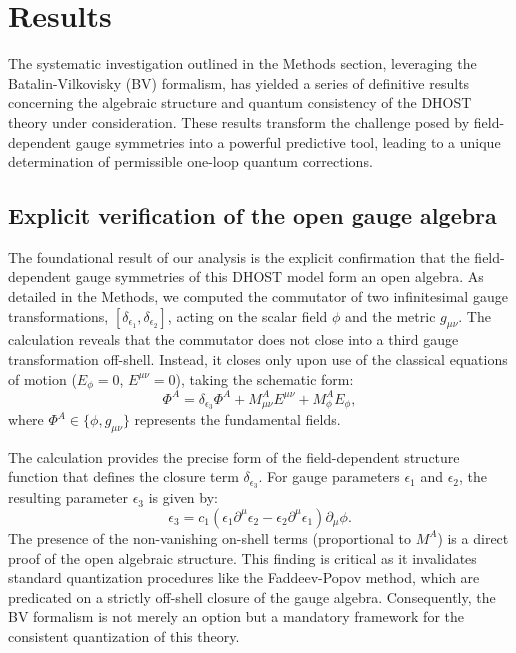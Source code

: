\documentclass[twocolumn]{aastex631}
\begin{document}
\section{Results}
\label{sec:results}
The systematic investigation outlined in the Methods section, leveraging the Batalin-Vilkovisky (BV) formalism, has yielded a series of definitive results concerning the algebraic structure and quantum consistency of the DHOST theory under consideration. These results transform the challenge posed by field-dependent gauge symmetries into a powerful predictive tool, leading to a unique determination of permissible one-loop quantum corrections.

\subsection{Explicit verification of the open gauge algebra}
The foundational result of our analysis is the explicit confirmation that the field-dependent gauge symmetries of this DHOST model form an open algebra. As detailed in the Methods, we computed the commutator of two infinitesimal gauge transformations, $[\delta_{\epsilon_1}, \delta_{\epsilon_2}]$, acting on the scalar field $\phi$ and the metric $g_{\mu\nu}$. The calculation reveals that the commutator does not close into a third gauge transformation off-shell. Instead, it closes only upon use of the classical equations of motion ($E_\phi=0$, $E^{\mu\nu}=0$), taking the schematic form:
\begin{equation}
    [\delta_{\epsilon_1}, \delta_{\epsilon_2}] \Phi^A = \delta_{\epsilon_3} \Phi^A + M^A_{\mu\nu} E^{\mu\nu} + M^A_{\phi} E_{\phi},
\end{equation}
where $\Phi^A \in \{\phi, g_{\mu\nu}\}$ represents the fundamental fields.

The calculation provides the precise form of the field-dependent structure function that defines the closure term $\delta_{\epsilon_3}$. For gauge parameters $\epsilon_1$ and $\epsilon_2$, the resulting parameter $\epsilon_3$ is given by:
\begin{equation}
    \epsilon_3 = c_1 (\epsilon_1 \partial^\mu \epsilon_2 - \epsilon_2 \partial^\mu \epsilon_1) \partial_\mu \phi.
    \label{eq:structure_function}
\end{equation}
The presence of the non-vanishing on-shell terms (proportional to $M^A$) is a direct proof of the open algebraic structure. This finding is critical as it invalidates standard quantization procedures like the Faddeev-Popov method, which are predicated on a strictly off-shell closure of the gauge algebra. Consequently, the BV formalism is not merely an option but a mandatory framework for the consistent quantization of this theory.
\end{document}

